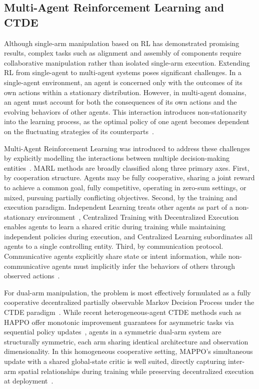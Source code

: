 \subsection{Multi-Agent Reinforcement Learning and CTDE}\label{subsec:lit_marl}

Although single-arm manipulation based on RL has demonstrated promising results, complex tasks such
as alignment and assembly of components require collaborative manipulation rather than isolated
single-arm execution. Extending RL from single-agent to multi-agent systems poses significant
challenges. In a single-agent environment, an agent is concerned only with the outcomes of its own
actions within a stationary distribution. However, in multi-agent domains, an agent must account for
both the consequences of its own actions and the evolving behaviors of other agents. This
interaction introduces non-stationarity into the learning process, as the optimal policy of one
agent becomes dependent on the fluctuating strategies of its
counterparts~\citep{low2025cooperative,nguyen2020deep}.

Multi-Agent Reinforcement Learning was introduced to address these challenges by explicitly
modelling the interactions between multiple decision-making
entities~\citep{albrecht2024multi,low2025cooperative}. MARL methods are broadly classified along
three primary axes. First, by cooperation structure. Agents may be fully cooperative, sharing a
joint reward to achieve a common goal, fully competitive, operating in zero-sum settings, or mixed,
pursuing partially conflicting objectives. Second, by the training and execution paradigm.
Independent Learning treats other agents as part of a non-stationary
environment~\citep{dewitt2020independent}, Centralized Training with Decentralized Execution enables
agents to learn a shared critic during training while maintaining independent policies during
execution, and Centralized Learning subordinates all agents to a single controlling entity. Third,
by communication protocol. Communicative agents explicitly share state or intent information, while
non-communicative agents must implicitly infer the behaviors of others through observed
actions~\citep{liu2024efficient, chai2025survey}.

For dual-arm manipulation, the problem is most effectively formulated as a fully cooperative
decentralized partially observable Markov Decision Process under the CTDE
paradigm~\citep{yu2022surprising}. While recent heterogeneous-agent CTDE methods such as
HAPPO offer monotonic improvement guarantees for asymmetric tasks via sequential policy
updates~\citep{kuba2021trust}, agents in a symmetric dual-arm system are structurally symmetric,
each arm sharing identical architecture and observation dimensionality. In this homogeneous
cooperative setting, MAPPO's simultaneous update with a shared global-state critic is well suited,
directly capturing inter-arm spatial relationships during training while preserving decentralized
execution at deployment~\citep{chai2025survey}.

